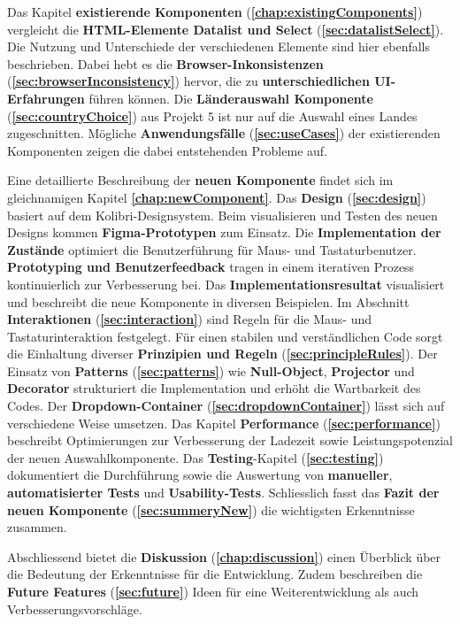Das Kapitel \textbf{existierende Komponenten} (\textbf{\ref{chap:existingComponents}}) vergleicht die \textbf{HTML-Elemente Datalist und Select} (\textbf{\ref{sec:datalistSelect}}). 
Die Nutzung und Unterschiede der verschiedenen Elemente sind hier ebenfalls beschrieben. 
Dabei hebt es die \textbf{Browser-Inkonsistenzen} (\textbf{\ref{sec:browserInconsistency}}) hervor, die zu \textbf{unterschiedlichen UI-Erfahrungen} führen können. 
Die \textbf{Länderauswahl Komponente} (\textbf{\ref{sec:countryChoice}}) aus Projekt 5 ist nur auf die Auswahl eines Landes zugeschnitten. 
Mögliche \textbf{Anwendungsfälle} (\textbf{\ref{sec:useCases}}) der existierenden Komponenten zeigen die dabei entstehenden Probleme auf. 

Eine detaillierte Beschreibung der \textbf{neuen Komponente} findet sich im gleichnamigen Kapitel \textbf{\ref{chap:newComponent}}. 
Das \textbf{Design} (\textbf{\ref{sec:design}}) basiert auf dem Kolibri-Designsystem. 
Beim visualisieren und Testen des neuen Designs kommen \textbf{Figma-Prototypen} zum Einsatz. 
Die \textbf{Implementation der Zustände} optimiert die Benutzerführung für Maus- und Tastaturbenutzer. 
\textbf{Prototyping und Benutzerfeedback} tragen in einem iterativen Prozess kontinuierlich zur Verbesserung bei. 
Das \textbf{Implementationsresultat} visualisiert und beschreibt die neue Komponente in diversen Beispielen.
Im Abschnitt \textbf{Interaktionen} (\textbf{\ref{sec:interaction}}) sind Regeln für die Maus- und Tastaturinteraktion festgelegt. 
Für einen stabilen und verständlichen Code sorgt die Einhaltung diverser \textbf{Prinzipien und Regeln} (\textbf{\ref{sec:principleRules}}). 
Der Einsatz von \textbf{Patterns} (\textbf{\ref{sec:patterns}}) wie \textbf{Null-Object}, \textbf{Projector} und \textbf{Decorator} strukturiert die Implementation und erhöht die Wartbarkeit des Codes. 
Der \textbf{Dropdown-Container} (\textbf{\ref{sec:dropdownContainer}}) lässt sich auf verschiedene Weise umsetzen. 
Das Kapitel \textbf{Performance} (\textbf{\ref{sec:performance}}) beschreibt Optimierungen zur Verbesserung der Ladezeit sowie Leistungspotenzial der neuen Auswahlkomponente. 
Das \textbf{Testing}-Kapitel (\textbf{\ref{sec:testing}}) dokumentiert die Durchführung sowie die Auswertung von \textbf{manueller}, \textbf{automatisierter Tests} und \textbf{Usability-Tests}. 
Schliesslich fasst das \textbf{Fazit der neuen Komponente} (\textbf{\ref{sec:summeryNew}}) die wichtigsten Erkenntnisse zusammen. 

Abschliessend bietet die \textbf{Diskussion} (\textbf{\ref{chap:discussion}}) einen Überblick über die Bedeutung der Erkenntnisse für die Entwicklung. 
Zudem beschreiben die \textbf{Future Features} (\textbf{\ref{sec:future}}) Ideen für eine Weiterentwicklung als auch Verbesserungsvorschläge. 

